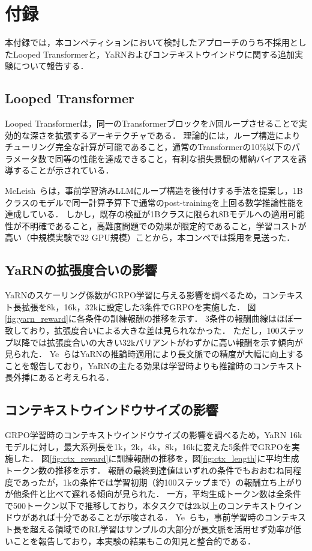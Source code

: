 \documentclass[
  platex, dvipdfmx,  %
]{nlp2026}
\begin{document}
\section{付録}
\label{sec:rl}

本付録では，本コンペティションにおいて検討したアプローチのうち不採用としたLooped Transformerと，YaRNおよびコンテキストウインドウに関する追加実験について報告する．

\subsection{Looped Transformer}

Looped Transformerは，同一のTransformerブロックを$N$回ループさせることで実効的な深さを拡張するアーキテクチャである．
理論的には，ループ構造によりチューリング完全な計算が可能であること\cite{giannou2023looped}，通常のTransformerの10\%以下のパラメータ数で同等の性能を達成できること\cite{yang2024looped}，有利な損失景観の帰納バイアスを誘導すること\cite{fan2025looped_landscape}が示されている．

McLeish~ら\cite{mcleish2025retrofitting}は，事前学習済みLLMにループ構造を後付けする手法を提案し，1Bクラスのモデルで同一計算予算下で通常のpost-trainingを上回る数学推論性能を達成している．
しかし，既存の検証が1Bクラスに限られ8Bモデルへの適用可能性が不明確であること，高難度問題での効果が限定的であること，学習コストが高い（中規模実験で32 GPU規模）ことから，本コンペでは採用を見送った．

\subsection{YaRNの拡張度合いの影響}

YaRNのスケーリング係数がGRPO学習に与える影響を調べるため，コンテキスト長拡張を8k，16k，32kに設定した3条件でGRPOを実施した．
図\ref{fig:yarn_reward}に各条件の訓練報酬の推移を示す．
3条件の報酬曲線はほぼ一致しており，拡張度合いによる大きな差は見られなかった．
ただし，100ステップ以降では拡張度合いの大きい32kバリアントがわずかに高い報酬を示す傾向が見られた．
Ye~ら\cite{polaris}はYaRNの推論時適用により長文脈での精度が大幅に向上することを報告しており，YaRNの主たる効果は学習時よりも推論時のコンテキスト長外挿にあると考えられる．

\subsection{コンテキストウインドウサイズの影響}

GRPO学習時のコンテキストウインドウサイズの影響を調べるため，YaRN 16kモデルに対し，最大系列長を1k，2k，4k，8k，16kに変えた5条件でGRPOを実施した．
図\ref{fig:ctx_reward}に訓練報酬の推移を，図\ref{fig:ctx_length}に平均生成トークン数の推移を示す．
報酬の最終到達値はいずれの条件でもおおむね同程度であったが，1kの条件では学習初期（約100ステップまで）の報酬立ち上がりが他条件と比べて遅れる傾向が見られた．
一方，平均生成トークン数は全条件で500トークン以下で推移しており，本タスクでは2k以上のコンテキストウインドウがあれば十分であることが示唆される．
Ye~ら\cite{polaris}も，事前学習時のコンテキスト長を超える領域でのRL学習はサンプルの大部分が長文脈を活用せず効率が低いことを報告しており，本実験の結果もこの知見と整合的である．
\end{document}

